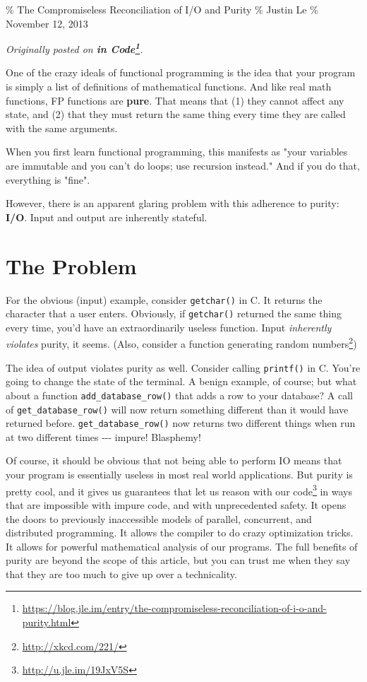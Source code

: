 \documentclass[]{article}
\renewcommand{\href}[2]{#2\footnote{\url{#1}}}
\begin{document}
\% The Compromiseless Reconciliation of I/O and Purity \% Justin Le \% November
12, 2013

\emph{Originally posted on
\textbf{\href{https://blog.jle.im/entry/the-compromiseless-reconciliation-of-i-o-and-purity.html}{in
Code}}.}

One of the crazy ideals of functional programming is the idea that your program
is simply a list of definitions of mathematical functions. And like real math
functions, FP functions are \textbf{pure}. That means that (1) they cannot
affect any state, and (2) that they must return the same thing every time they
are called with the same arguments.

When you first learn functional programming, this manifests as "your variables
are immutable and you can't do loops; use recursion instead." And if you do
that, everything is "fine".

However, there is an apparent glaring problem with this adherence to purity:
\textbf{I/O}. Input and output are inherently stateful.

\section{The Problem}

For the obvious (input) example, consider \texttt{getchar()} in C. It returns
the character that a user enters. Obviously, if \texttt{getchar()} returned the
same thing every time, you'd have an extraordinarily useless function. Input
\emph{inherently violates} purity, it seems. (Also, consider a
\href{http://xkcd.com/221/}{function generating random numbers})

The idea of output violates purity as well. Consider calling \texttt{printf()}
in C. You're going to change the state of the terminal. A benign example, of
course; but what about a function \texttt{add\_database\_row()} that adds a row
to your database? A call of \texttt{get\_database\_row()} will now return
something different than it would have returned before.
\texttt{get\_database\_row()} now returns two different things when run at two
different times -\/-\/- impure! Blasphemy!

Of course, it should be obvious that not being able to perform IO means that
your program is essentially useless in most real world applications. But purity
is pretty cool, and it gives us guarantees that let us
\href{http://u.jle.im/19JxV5S}{reason with our code} in ways that are impossible
with impure code, and with unprecedented safety. It opens the doors to
previously inaccessible models of parallel, concurrent, and distributed
programming. It allows the compiler to do crazy optimization tricks. It allows
for powerful mathematical analysis of our programs. The full benefits of purity
are beyond the scope of this article, but you can trust me when they say that
they are too much to give up over a technicality.
\end{document}
